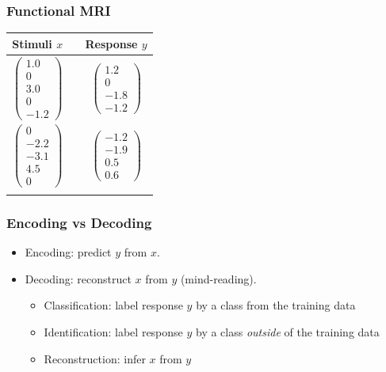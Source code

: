 \documentclass{beamer}
\begin{document}
\begin{frame}
\frametitle{Functional MRI}
\begin{center}
\begin{tabular}{ccc}
\hline
Stimuli $x$ & & Response $y$\\ \hline
$\begin{pmatrix}1.0 \\ 0 \\ 3.0 \\ 0\\ -1.2\end{pmatrix}$ & \hspace{1in} & $\begin{pmatrix}1.2 \\ 0 \\ -1.8\\ -1.2\end{pmatrix}$ \\ \hline
$\begin{pmatrix}0 \\ -2.2 \\ -3.1 \\ 4.5\\ 0\end{pmatrix}$ & \hspace{1in} & $\begin{pmatrix}-1.2 \\ -1.9\\ 0.5\\ 0.6\end{pmatrix}$ \\ \hline
\hspace{1in} & \hspace{1in} & \hspace{1in}
\end{tabular}
\end{center}
\end{frame}

\begin{frame}
\frametitle{Encoding vs Decoding}
\begin{itemize}
\item Encoding: predict $y$ from $x$.
\item Decoding: reconstruct $x$ from $y$ (mind-reading).
\begin{itemize}
\item Classification: label response $y$ by a class from the training data
\item Identification: label response $y$ by a class \emph{outside} of the training data
\item Reconstruction: infer $x$ from $y$
\end{itemize}
\end{itemize}
\end{frame}
\end{document}
